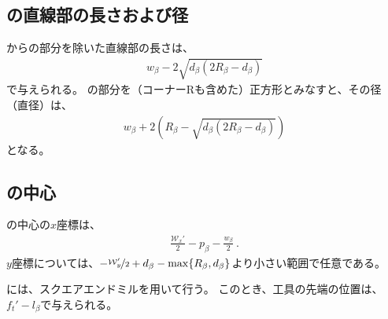 \clearpage
\subsection{\EndFaceBoringWidth の直線部の長さおよび径}
\EndFaceBoringWidth から\EndFaceBoringCornerR の部分を除いた直線部の長さは、
\begin{align*}
  w_\beta-2\sqrt{d_\beta(2R_\beta-d_\beta)}
\end{align*}
で与えられる。
\EndFaceBoring の部分を（コーナーRも含めた）正方形とみなすと、その径（直径）は、
\begin{align*}
  w_\beta+2\left(R_\beta-\sqrt{d_\beta(2R_\beta-d_\beta)}\right)
\end{align*}
となる。


\subsection{\EndFaceBoring の中心}
\EndFaceBoringWidth の中心の$x$座標は、
\begin{align*}
  \frac{\mathcal W_x'}2-p_\beta-\frac{w_\beta}2\ .
\end{align*}
$y$座標については、$-\nicefrac{\mathcal W_y'}2+d_\beta-\max\{R_\beta, d_\beta\}$より小さい範囲で任意である。



\EndFaceBoringMilling には、スクエアエンドミルを用いて行う。
このとき、工具の先端の位置は、$f_t'-l_\beta$で与えられる。
